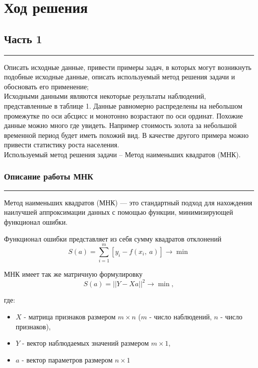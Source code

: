 \documentclass[a4paper, 14pt]{extarticle}
\begin{document}
\section*{{Ход решения}}

\subsection*{{Часть 1}}\vspace{-20pt}\rule{\linewidth}{0.1mm}

\vspace{-10pt} Описать исходные данные, привести примеры задач, в которых могут возникнуть 
подобные исходные данные, описать используемый метод решения задачи и обосновать его 
применение;\\

Исходными данными являются некоторые результаты наблюдений, представленные в таблице 1. Данные 
равномерно распределены на небольшом промежутке по оси абсцисс и монотонно возрастают по оси ординат. 
Похожие данные можно много где увидеть. Например стоимость золота за небольшой временной период будет 
иметь похожий вид. В качестве другого примера можно привести статистику роста населения.\\

Используемый метод решения задачи – Метод наименьших квадратов (МНК).\\

\subsubsection*{{Описание работы МНК}}\vspace{-20pt}\rule{\linewidth}{0.1mm}

Метод наименьших квадратов (МНК) — это стандартный подход для нахождения наилучшей 
аппроксимации данных с помощью функции, минимизирующей функционал ошибки.

Функционал ошибки представляет из себя сумму квадратов отклонений
$$S(a) = \sum\limits_{i=1}^{m}\left[y_i - f(x_i,\ a)\right] \longrightarrow \min$$

МНК имеет так же матричную формулировку
$$S(a) = ||Y - Xa||^2 \longrightarrow \min,$$

где:
\begin{itemize}
    \item $X$ - матрица признаков размером $m \times n$ ($m$ - число наблюдений, $n$ - число признаков),
    \item $Y$ - вектор наблюдаемых значений размером $m \times 1$,
    \item $a$ - вектор параметров размером $n \times 1$
\end{itemize}
\end{document}
